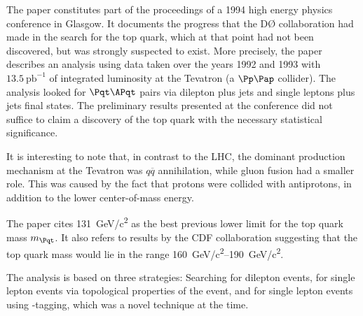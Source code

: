 

\captionsetup{width=0.45\textwidth}




The paper\cite{dzero} constitutes part of the proceedings of a 1994 high energy physics conference in Glasgow.
It documents the progress that the DØ collaboration had made in the search for the top quark, which at that point had not been discovered, but was strongly suspected to exist.
More precisely, the paper describes an analysis using data taken over the years 1992 and 1993 with $\SI{13.5}{\pico\barn}^{-1}$ of integrated luminosity at the Tevatron (a $\Pp\Pap$ collider).
The analysis looked for $\Pqt\APqt$ pairs via dilepton plus jets and single leptons plus jets final states.
The preliminary results presented at the conference did not suffice to claim a discovery of the top quark with the necessary statistical significance.

It is interesting to note that, in contrast to the LHC, the dominant \Pqt\!\!\APqt production mechanism at the Tevatron was $q\overline{q}$ annihilation, while gluon fusion had a smaller role.
This was caused by the fact that protons were collided with antiprotons, in addition to the lower center-of-mass energy.

The paper cites \SI{131}{GeV/c^2} as the best previous lower limit for the top quark mass $m_{\Pqt}$.
It also refers to results by the CDF collaboration\cite{cdf} suggesting that the top quark mass would lie in the range \SIrange{160}{190}{GeV/c^2}.

The analysis is based on three strategies: Searching for dilepton events, for single lepton events via topological properties of the event, and for single lepton events using \Pqb-tagging, which was a novel technique at the time.

